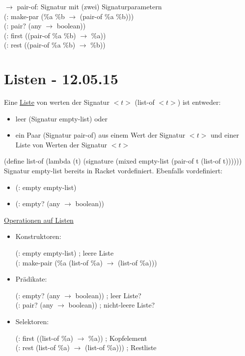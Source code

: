 \documentclass[a4paper, 20pt, openany]{book}
\begin{document}
$\rightarrow$ pair-of: Signatur mit (zwei) Signaturparametern \\

(: make-par (\%a \%b $\rightarrow$ (pair-of \%a \%b))) \\
(: pair? (any $\rightarrow$ boolean)) \\
(: first ((pair-of \%a \%b) $\rightarrow$ \%a)) \\
(: rest ((pair-of \%a \%b) $\rightarrow$ \%b)) \\ 

\chapter{Listen - 12.05.15}
Eine \underline{Liste} von werten der Signatur $<t>$ (list-of $<t>$) ist entweder: 

\begin{itemize}
  \item leer (Signatur empty-list) oder
  \item ein Paar (Signatur pair-of) aus einem Wert der Signatur $<t>$ und einer Liste von Werten der Signatur $<t>$
\end{itemize} 

(define list-of (lambda (t) (signature (mixed empty-list (pair-of t (list-of t)))))) \\

Signatur empty-list bereits in Racket vordefiniert. Ebenfalls vordefiniert: 

\begin{itemize}
  \item (: empty empty-list) 
  \item (: empty? (any $\rightarrow$ boolean))
\end{itemize}

\underline{Operationen auf Listen}
\begin{itemize}
  \item Konstruktoren:
  
  (: empty empty-list) ; leere Liste \\
  (: make-pair (\%a (list-of \%a) $\rightarrow$ (list-of \%a)))
  
  \item Prädikate: 
  
  (: empty? (any $\rightarrow$ boolean)) ; leer Liste? \\
  (: pair? (any $\rightarrow$ boolean)) ; nicht-leere Liste?
  
  \item Selektoren:
  
  (: first ((list-of \%a) $\rightarrow$ \%a)) ; Kopfelement \\
  (: rest (list-of \%a) $\rightarrow$ (list-of \%a))) ; Restliste
\end{itemize}
\end{document}
